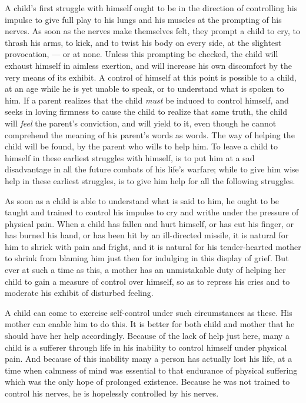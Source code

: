 \documentclass[
]{book}
\begin{document}
A child's first struggle with himself ought to be in the direction of controlling his impulse to give full play to his lungs and his muscles at the prompting of his nerves. As soon as the nerves make themselves felt, they prompt a child to cry, to thrash his arms, to kick, and to twist his body on every side, at the slightest provocation, --- or at none. Unless this prompting be checked, the child will exhaust himself in aimless exertion, and will increase his own discomfort by the very means of its exhibit. A control of himself at this point is possible to a child, at an age while he is yet unable to speak, or to understand what is spoken to him. If a parent realizes that the child \emph{must} be induced to control himself, and seeks in loving firmness to cause the child to realize that same truth, the child will \emph{feel} the parent's conviction, and will yield to it, even though he cannot comprehend the meaning of his parent's words as words. The way of helping the child will be found, by the parent who wills to help him. To leave a child to himself in these earliest struggles with himself, is to put him at a sad disadvantage in all the future combats of his life's warfare; while to give him wise help in these earliest struggles, is to give him help for all the following struggles.

As soon as a child is able to understand what is said to him, he ought to be taught and trained to control his impulse to cry and writhe under the pressure of physical pain. When a child has fallen and hurt himself, or has cut his finger, or has burned his hand, or has been hit by an ill-directed missile, it is natural for him to shriek with pain and fright, and it is natural for his tender-hearted mother to shrink from blaming him just then for indulging in this display of grief. But ever at such a time as this, a mother has an unmistakable duty of helping her child to gain a measure of control over himself, so as to repress his cries and to moderate his exhibit of disturbed feeling.

A child can come to exercise self-control under such circumstances as these. His mother can enable him to do this. It is better for both child and mother that he should have her help accordingly. Because of the lack of help just here, many a child is a sufferer through life in his inability to control himself under physical pain. And because of this inability many a person has actually lost his life, at a time when calmness of mind was essential to that endurance of physical suffering which was the only hope of prolonged existence. Because he was not trained to control his nerves, he is hopelessly controlled by his nerves.
\end{document}
